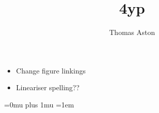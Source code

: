 \documentclass[12pt]{article}%
\title{4yp}
\author{Thomas Aston}
\begin{document}
  \maketitle
  \tableofcontents

\begin{itemize}
  \item Change figure linkings
  \item Lineariser spelling??
\end{itemize}

 
 
 

 
 
 
 
 


  























  


  \Urlmuskip=0mu plus 1mu
  \emergencystretch=1em
  \printbibliography{}
\end{document}
